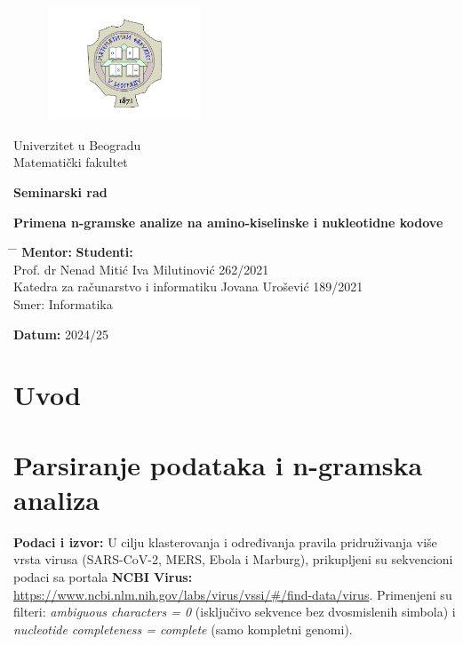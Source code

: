 \documentclass[a4paper,12pt]{article}
\begin{document}
\begin{titlepage}
    \centering
	\begin{figure}[htbp]
    	\centering
    	\includegraphics[width=0.4\textwidth]{images/logo.png}
	\end{figure}
    { Univerzitet u Beogradu \\ Matematički fakultet\par}
	
    \vfill

    {\Large \textbf{Seminarski rad}\par}

    \vspace{1cm}

    {\Large \textbf{Primena n-gramske analize na amino-kiselinske i nukleotidne kodove}\par}

    \vfill

    
	
	
	\begin{tabbing}
	\hspace{10cm} \= \hspace{10cm} \= \kill
	\textbf{Mentor:} \>  \textbf{Studenti:} \\
	Prof. dr Nenad Mitić \> Iva Milutinović 262/2021 \\
	Katedra za računarstvo i informatiku \> Jovana Urošević 189/2021 \\
	\> Smer: Informatika
	\end{tabbing}

    \vfill

    \textbf{Datum:} 2024/25

\end{titlepage}
\newpage
\tableofcontents
\newpage
\section{Uvod}
\newpage
\section{Parsiranje podataka i n-gramska analiza}
\textbf{Podaci i izvor:} U cilju klasterovanja i određivanja pravila pridruživanja više vrsta virusa (SARS-CoV-2, MERS, Ebola i Marburg), prikupljeni su sekvencioni podaci sa portala \textbf{NCBI Virus:} \url{https://www.ncbi.nlm.nih.gov/labs/virus/vssi/#/find-data/virus}. Primenjeni su filteri: \textit{ambiguous characters = 0} (isključivo
sekvence bez dvosmislenih simbola) i \textit{nucleotide completeness = complete} (samo kompletni genomi).
\end{document}
